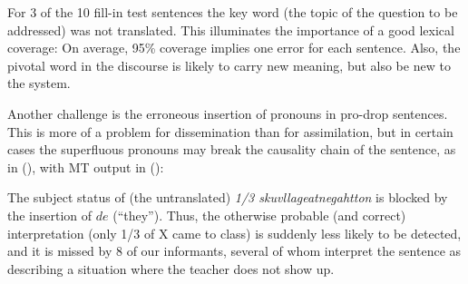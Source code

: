 \documentclass{book}
\begin{document}
For 3 of the 10 fill-in test sentences the key word (the topic of
the question to be addressed) was not translated. This illuminates
the importance of a good lexical coverage: On average, 95\% coverage implies
one error for each sentence. Also, the pivotal word in the discourse
is likely to carry new meaning, but also be new to
the system. 

Another challenge is the erroneous insertion of pronouns in pro-drop
sentences. This is more of a problem for dissemination than for
assimilation, but in certain cases the superfluous pronouns may break
the causality chain of the sentence, as in (), with \nob{} MT
output in ():



The subject status of (the untranslated) \textit{1/3
  skuvllageatnegahtton} is blocked by the insertion of $de$
(``they''). Thus, the otherwise probable (and correct) interpretation
(only 1/3 of X came to class) is suddenly less likely to be detected,
and it is missed by 8 of our informants, several of whom interpret the
sentence as describing a situation where the teacher does not show up.

\end{document}
